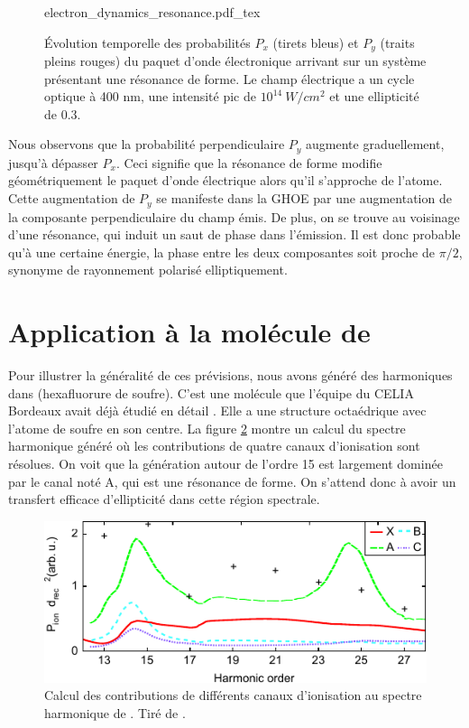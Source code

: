 \begin{figure}[!ht]
\centering
\def\svgwidth{1\columnwidth}
{electron_dynamics_resonance.pdf_tex}
\caption{\'{E}volution temporelle des probabilités $P_x$ (tirets bleus) et $P_y$ (traits pleins rouges) du paquet d'onde électronique arrivant sur un système présentant une résonance de forme. Le champ électrique a un cycle optique à 400 nm, une intensité pic de $10^{14}~\si{W/cm^2}$ et une ellipticité de 0.3.}
\label{fig:resonant_proba}
\end{figure}

Nous observons que la probabilité perpendiculaire $P_y$ augmente graduellement, jusqu'à dépasser $P_x$. Ceci signifie que la résonance de forme modifie géométriquement le paquet d'onde électrique alors qu'il s'approche de l'atome. Cette augmentation de $P_y$ se manifeste dans la GHOE par une augmentation de la composante perpendiculaire du champ émis. De plus, on se trouve au voisinage d'une résonance, qui induit un saut de phase dans l'émission. Il est donc probable qu'à une certaine énergie, la phase entre les deux composantes soit proche de $\pi/2$, synonyme de rayonnement polarisé elliptiquement.

\section{Application à la molécule de }
\label{sec:sf6ghoe}
Pour illustrer la généralité de ces prévisions, nous avons généré des harmoniques dans  (hexafluorure de soufre). C'est une molécule que l'équipe du CELIA Bordeaux avait déjà étudié en détail . Elle a une structure octaédrique avec l'atome de soufre en son centre. La figure \ref{fig:sf6_cross_section} montre un calcul du spectre harmonique généré  où les contributions de quatre canaux d'ionisation sont résolues. On voit que la génération autour de l'ordre 15 est largement dominée par le canal noté A, qui est une résonance de forme. On s'attend donc à avoir un transfert efficace d'ellipticité dans cette région spectrale.

\begin{figure}[!ht]
\centering
\includegraphics[width=.75\columnwidth]{Figures/SF6/sf6_channel_contribution.pdf}%
\caption{Calcul des contributions de différents canaux d'ionisation au spectre harmonique de . Tiré de .}
\label{fig:sf6_cross_section}
\end{figure}

